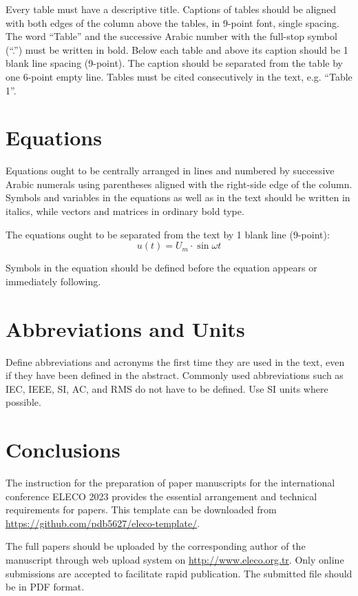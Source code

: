 \documentclass[9pt]{extarticle}
\begin{document}
Every table must have a descriptive title. Captions of tables should be aligned with both edges of the column above the tables, in 9-point font, single spacing. The word ``Table'' and the successive Arabic number with the full-stop symbol (``.'') must be written in bold. Below each table and above its caption should be 1 blank line spacing (9-point). The caption should be separated from the table by one 6-point empty line. Tables must be cited consecutively in the text, e.g. ``Table 1''.


\section{Equations}

Equations ought to be centrally arranged in lines and numbered by successive Arabic numerals using parentheses aligned with the right-side edge of the column. Symbols and variables in the equations as well as in the text should be written in italics, while vectors and matrices in ordinary bold type.

The equations ought to be separated from the text by 1 blank line (9-point):
%
\begin{equation}
	\label{eqn:voltage-sine}
	u(t) = U_m \cdot \sin \omega t
\end{equation}

Symbols in the equation should be defined before the equation appears or immediately following.

\section{Abbreviations and Units}

Define abbreviations and acronyms the first time they are used in the text, even if they have been defined in the abstract. Commonly used abbreviations such as IEC, IEEE, SI, AC, and RMS do not have to be defined. Use SI units where possible.

\section{Conclusions}

The instruction for the preparation of paper manuscripts for the international conference ELECO 2023 provides the essential arrangement and technical requirements for papers. This template can be downloaded from \url{https://github.com/pdb5627/eleco-template/}.

The full papers should be uploaded by the corresponding author of the manuscript through web upload system on \url{http://www.eleco.org.tr}. Only online submissions are accepted to facilitate rapid publication. The submitted file should be in PDF format.
\end{document}

